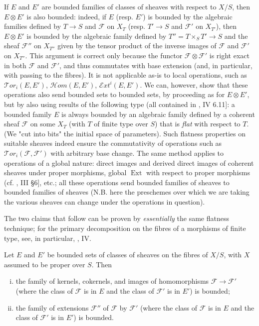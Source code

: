 If $E$ and $E'$ are bounded families of classes of sheaves with respect to $X/S$, then $E\otimes E'$ is also bounded:
indeed, if $E$ (resp. $E'$) is bounded by the algebraic families defined by $T\to S$ and $\mathcal{F}$ on $X_T$ (resp. $T'\to S$ and $\mathcal{F}'$ on $X_{T'}$), then $E\otimes E'$ is bounded by the algebraic family defined by $T''=T\times_S T'\to S$ and the sheaf $\mathcal{F}''$ on $X_{T''}$ given by the tensor product of the inverse images of $\mathcal{F}$ and $\mathcal{F}'$ on $X_{T''}$.
This argument is correct only because the functor $\mathcal{F}\otimes\mathcal{F}'$ is right exact in both $\mathcal{F}$ and $\mathcal{F}'$, and thus commutates with base extension (and, in particular, with passing to the fibres).
It is not applicable as-is to local operations, such as $\mathcal{T}or_i(E,E')$, $\mathcal{H}om(E,E')$, $\mathcal{E}xt^i(E,E')$.
We can, however, show that these operations also send bounded sets to bounded sets, by proceeding as for $E\otimes E'$, but by also using results of the following type (all contained in \cite{Gro1960b}, IV 6.11]:
a bounded family $E$ is always bounded by an algebraic family defined by a coherent sheaf $\mathcal{F}$ on some $X_T$ (with $T$ of finite type over $S$) that is \emph{flat} with respect to $T$.
(We "cut into bits" the initial space of parameters).
Such flatness properties on suitable sheaves indeed ensure the commutativity of operations such as $\mathcal{T}or_i(\mathcal{F},\mathcal{F}')$ with arbitrary base change.
The same method applies to operations of a global nature:
direct images and derived direct images of coherent sheaves under proper morphisms, global $\operatorname{Ext}$ with respect to proper morphisms (cf. \cite{GD1960}, III §6], etc.;
all these operations send bounded families of sheaves to bounded families of sheaves (N.B. here the preschemes over which we are taking the various sheaves can change under the operations in question).

The two claims that follow can be proven by \emph{essentially} the same flatness technique;
for the primary decomposition on the fibres of a morphisms of finite type, see, in particular, \cite{GD1960}, IV.

\begin{proposition}\label{fga3.iv-1-proposition-1.2}
  Let $E$ and $E'$ be bounded sets of classes of sheaves on the fibres of $X/S$, with $X$ assumed to be proper over $S$.
  Then
  \begin{enumerate}[i.]
    \item the family of kernels, cokernels, and images of homomorphisms $\mathcal{F}\to\mathcal{F}'$ (where the class of $\mathcal{F}$ is in $E$ and the class of $\mathcal{F}'$ is in $E'$) is bounded;
    \item the family of extensions $\mathcal{F}''$ of $\mathcal{F}$ by $\mathcal{F}'$ (where the class of $\mathcal{F}$ is in $E$ and the class of $\mathcal{F}'$ is in $E'$) is bounded.
  \end{enumerate}
\end{proposition}

